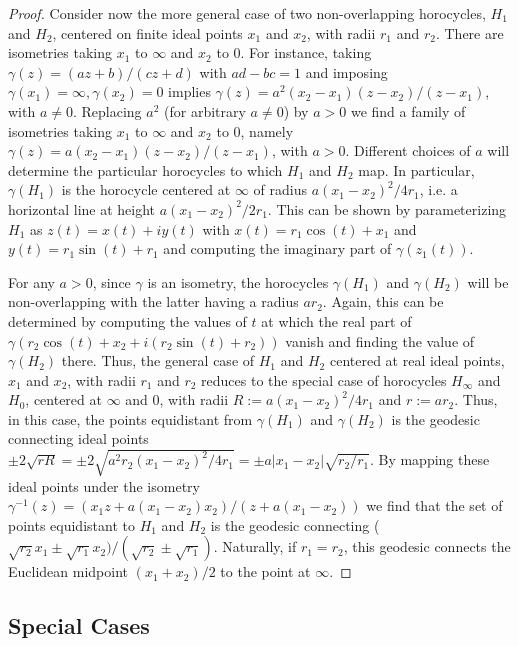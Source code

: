 \documentclass[10pt,a4paper]{article}
\begin{document}
\begin{proof}
 Consider now the more general case of two non-overlapping horocycles, $H_1$ and $H_2$, centered on finite ideal points $x_1$ and $x_2$, with radii $r_1$ and $r_2$. There are isometries taking $x_1$ to $\infty$ and $x_2$ to $0$. For instance, taking $\gamma(z) = (az + b)/(cz + d)$ with $ad-bc = 1$ and imposing $\gamma(x_1)=\infty, \gamma(x_2) = 0$ implies $\gamma(z) = a^2(x_2-x_1)(z-x_2)/(z-x_1)$, with $a \neq 0$. Replacing $a^2$ (for arbitrary $a\neq 0$) by $a > 0$ we find a family of isometries taking $x_1$ to $\infty$ and $x_2$ to $0$, namely $\gamma(z) = a(x_2-x_1)(z-x_2)/(z-x_1)$, with $a > 0$. Different choices of $a$ will determine the particular horocycles to which $H_1$ and $H_2$ map.  In particular, $\gamma(H_1)$ is the horocycle centered at $\infty$ of radius $a (x_1 - x_2)^2 / 4 r_1$, i.e. a horizontal line at height $a (x_1 - x_2)^2 / 2 r_1$.  This can be shown by parameterizing $H_1$ as $z(t) = x(t)+iy(t)$ with $x(t) = r_1\cos(t) + x_1$ and $y(t) = r_1\sin(t) + r_1$ and computing the imaginary part of $\gamma(z_1(t))$.

 For any $a > 0$, since $\gamma$ is an isometry, the horocycles $\gamma(H_1)$ and $\gamma(H_2)$ will be non-overlapping with the latter having a radius $a r_2$.  Again, this can be determined by computing the values of $t$ at which the real part of $\gamma(r_2\cos(t) + x_2 + i(r_2\sin(t) + r_2))$ vanish and finding the value of $\gamma(H_2)$ there.  Thus, the general case of $H_1$ and $H_2$ centered at real ideal points, $x_1$ and $x_2$, with radii $r_1$ and $r_2$ reduces to the special case of horocycles $H_{\infty}$ and $H_0$, centered at $\infty$ and $0$, with radii $R := a (x_1 - x_2)^2 / 4 r_1$ and $r :=  a r_2$.  Thus, in this case, the points equidistant from $\gamma(H_1)$ and $\gamma(H_2)$ is the geodesic connecting ideal points $\pm 2\sqrt{rR} = \pm 2\sqrt{a^2r_2(x_1-x_2)^2/4r_1} = \pm a \vert x_1-x_2 \vert \sqrt{r_2/r_1}$. By mapping these ideal points under the isometry $\gamma^{-1}(z) = (x_1 z + a(x_1-x_2)x_2)/(z + a(x_1-x_2))$ we find that the set of points equidistant to $H_1$ and $H_2$ is the geodesic connecting ($\sqrt{r_2}x_1 \pm \sqrt{r_1}x_2)/(\sqrt{r_2} \pm \sqrt{r_1})$. Naturally, if $r_1 = r_2$, this geodesic connects the Euclidean midpoint $(x_1  + x_2)/2$ to the point at $\infty$.
 \end{proof}

 \subsection{Special Cases}
 \label{ssec:dist2horos-cases}
\end{document}
